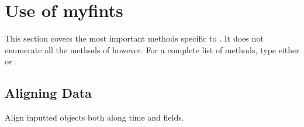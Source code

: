 \section{Use of myfints\label{sec:myfints}}

This section covers the most important methods specific to
\myfints{}.
It does not enumerate all the methods of \myfints{} however.
For a complete list of methods, type either 
or .

\subsection{Aligning Data}

   Align inputted  objects both along time and fields. 
  

